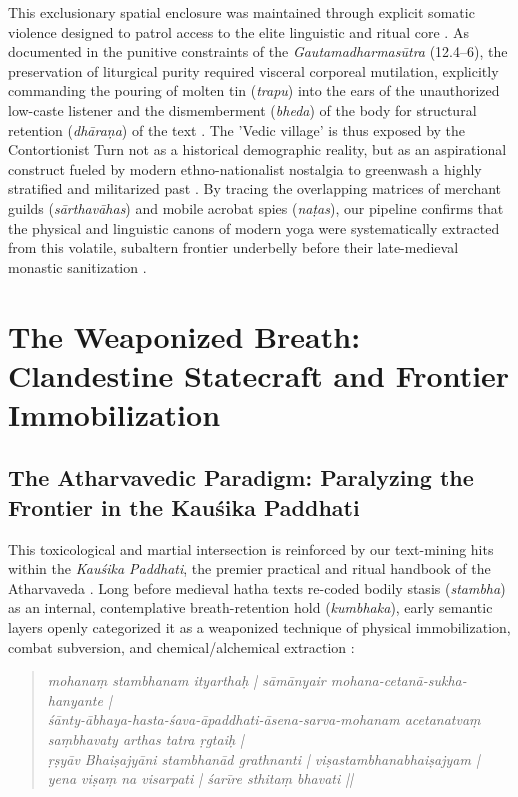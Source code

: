 \documentclass[11pt,twoside,letterpaper]{article}
\begin{document}
This exclusionary spatial enclosure was maintained through explicit somatic violence designed to patrol access to the elite linguistic and ritual core \citep{McCartney2026}. As documented in the punitive constraints of the \textit{Gautamadharmas\={u}tra} (12.4–6), the preservation of liturgical purity required visceral corporeal mutilation, explicitly commanding the pouring of molten tin (\textit{trapu}) into the ears of the unauthorized low-caste listener and the dismemberment (\textit{bheda}) of the body for structural retention (\textit{dh\={a}ra\d{n}a}) of the text \citep{McCartney2026}. The 'Vedic village' is thus exposed by the Contortionist Turn not as a historical demographic reality, but as an aspirational construct fueled by modern ethno-nationalist nostalgia to greenwash a highly stratified and militarized past \citep{McCartney2026}. By tracing the overlapping matrices of merchant guilds (\textit{s\={a}rthav\={a}has}) and mobile acrobat spies (\textit{na\d{t}as}), our pipeline confirms that the physical and linguistic canons of modern yoga were systematically extracted from this volatile, subaltern frontier underbelly before their late-medieval monastic sanitization \citep{McCartney2026}.

\section{The Weaponized Breath: Clandestine Statecraft and Frontier Immobilization}

\subsection{The Atharvavedic Paradigm: Paralyzing the Frontier in the Kau\'sika Paddhati}
This toxicological and martial intersection is reinforced by our text-mining hits within the \textit{Kau\'sika Paddhati}, the premier practical and ritual handbook of the Atharvaveda \citep{KausP}. Long before medieval hatha texts re-coded bodily stasis (\textit{stambha}) as an internal, contemplative breath-retention hold (\textit{kumbhaka}), early semantic layers openly categorized it as a weaponized technique of physical immobilization, combat subversion, and chemical/alchemical extraction \citep{Birch2024, KausP}:

\begin{quote}
\small
\textit{mohana\d{m} stambhanam ityartha\d{h} | s\={a}m\={a}nyair mohana-cetan\={a}-sukha-hanyante | \\
\'s\={a}nty-\={a}bhaya-hasta-\'sava-\={a}paddhati-\={a}sena-sarva-mohanam acetanatva\d{m} sa\d{m}bhavaty arthas tatra \d{r}gtai\d{h} | \\
\d{r}\d{s}y\={a}v Bhai\d{s}ajy\={a}ni stambhan\={a}d grathnanti | vi\d{s}astambhanabhai\d{s}ajyam | \\
yena vi\d{s}a\d{m} na visarpati | \'sar\={i}re sthita\d{m} bhavati ||}
\end{quote}
\end{document}
